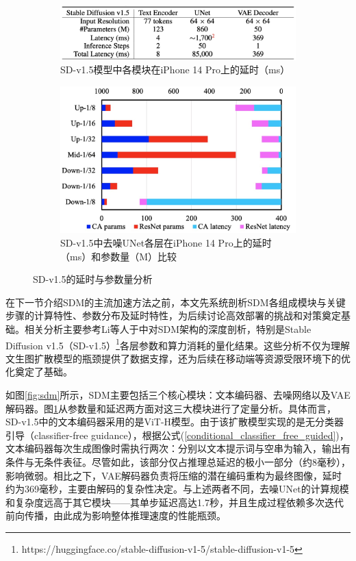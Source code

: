 \documentclass[11pt,a4paper,UTF8]{ctexart}
\begin{document}
\begin{figure}[htbp]
    \centering
    \begin{subfigure}[b]{0.49\textwidth}
        \centering
        \includegraphics[width=\linewidth]{img/sdv15_latency.jpg}
        \caption{SD-v1.5模型中各模块在iPhone 14 Pro上的延时（ms）}
        \label{fig:latency_three}
    \end{subfigure}
    \hfill
    \begin{subfigure}[b]{0.49\textwidth}
        \centering
        \includegraphics[width=\linewidth]{img/unet_latency_params.jpg}
        \caption{SD-v1.5中去噪UNet各层在iPhone 14 Pro上的延时（ms）和参数量（M）比较}
        \label{fig:latency_params_unet}
    \end{subfigure}
    \caption{SD-v1.5的延时与参数量分析}
    \label{fig:sd_v15}
\end{figure}

在下一节介绍SDM的主流加速方法之前，本文先系统剖析SDM各组成模块与关键步骤的计算特性、参数分布及延时特性，为后续讨论高效部署的挑战和对策奠定基础。相关分析主要参考Li等人于\cite{li2023snapfusion}中对SDM架构的深度剖析，特别是Stable Diffusion v1.5（SD-v1.5）\footnote{https://huggingface.co/stable-diffusion-v1-5/stable-diffusion-v1-5}各层参数和算力消耗的量化结果。这些分析不仅为理解文生图扩散模型的瓶颈提供了数据支撑，还为后续在移动端等资源受限环境下的优化奠定了基础。

如图\ref{fig:sdm}所示，SDM主要包括三个核心模块：文本编码器、去噪网络以及VAE解码器。图\ref{fig:latency_three}从参数量和延迟两方面对这三大模块进行了定量分析。具体而言，SD-v1.5中的文本编码器采用的是ViT-H模型\cite{radford2021learning}。由于该扩散模型实现的是无分类器引导（classifier-free guidance），根据公式(\ref{conditional_classifier_free_guided})，文本编码器每次生成图像时需执行两次：分别以文本提示词与空串为输入，输出有条件与无条件表征。尽管如此，该部分仅占推理总延迟的极小一部分（约8毫秒），影响微弱。相比之下，VAE解码器负责将压缩的潜在编码重构为最终图像，延时约为369毫秒，主要由解码的复杂性决定。与上述两者不同，去噪UNet的计算规模和复杂度远高于其它模块——其单步延迟高达1.7秒，并且生成过程依赖多次迭代前向传播，由此成为影响整体推理速度的性能瓶颈。
\end{document}
